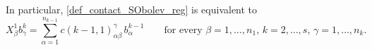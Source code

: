 \documentclass[11pt]{amsart}
\newcommand{\hhh}{{\mathcal{H}}}
\newcommand{\bb}{{\bf {b}}} %
\theoremstyle{plain}
\newtheorem{proposition}[theorem]{Proposition}
\theoremstyle{definition}
\theoremstyle{remark}
\numberwithin{equation}{section}
\begin{document}
In particular, \eqref{def_contact_SObolev_reg} is equivalent to
\begin{equation} \label{eq_contact_components_first}
X^1_\beta b^k_\gamma = \sum_{\alpha=1}^{n_{k-1}} c(k-1,1)^\gamma_{\alpha \beta} \, b^{k-1}_\alpha\qquad \text{for every $\beta=1,\dots,n_1$, $k=2,\dots,s$, $\gamma=1,\dots,n_k$.}
\end{equation}
\end{document}
